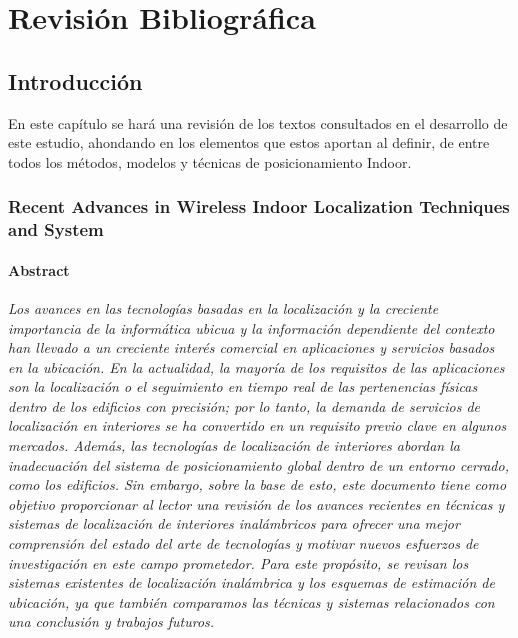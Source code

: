 \chapter{Revisión Bibliográfica}
\section{Introducción}
En este capítulo se hará una revisión de los textos consultados en el desarrollo de este estudio, ahondando en los elementos que estos aportan al definir, de entre todos los métodos, modelos y técnicas de posicionamiento Indoor.\\
\subsection{Recent Advances in Wireless Indoor Localization Techniques and System}
\subsubsection{Abstract}

\emph{Los avances en las tecnologías basadas en la localización y la creciente importancia de la informática ubicua y la información dependiente del contexto han llevado a un creciente interés comercial en aplicaciones y servicios basados en la ubicación. En la actualidad, la mayoría de los requisitos de las aplicaciones son la localización o el seguimiento en tiempo real de las pertenencias físicas dentro de los edificios con precisión; por lo tanto, la demanda de servicios de localización en interiores se ha convertido en un requisito previo clave en algunos mercados. Además, las tecnologías de localización de interiores abordan la inadecuación del sistema de posicionamiento global dentro de un entorno cerrado, como los edificios. Sin embargo, sobre la base de esto, este documento tiene como objetivo proporcionar al lector una revisión de los avances recientes en técnicas y sistemas de localización de interiores inalámbricos para ofrecer una mejor comprensión del estado del arte de tecnologías y motivar nuevos esfuerzos de investigación en este campo prometedor. Para este propósito, se revisan los sistemas existentes de localización inalámbrica y los esquemas de estimación de ubicación, ya que también comparamos las técnicas y sistemas relacionados con una conclusión y trabajos futuros.}\\

